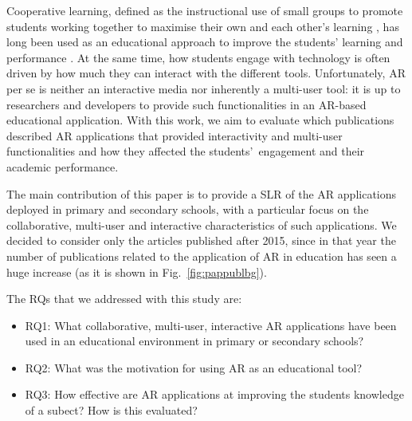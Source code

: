 Cooperative learning, defined as the instructional use of small groups to promote students working together to maximise their own and each other's learning \citep{johnson1991cooperation}, has long been used as an educational approach to improve the students' learning and performance \citep{johnson2008active, kuh2011piecing}. At the same time, how students engage with technology is often driven by how much they can interact with the different tools. Unfortunately, AR per se is neither an interactive media nor inherently a multi-user tool: it is up to researchers and developers to provide such functionalities in an AR-based educational application. With this work, we aim to evaluate which publications described AR applications that provided interactivity and multi-user functionalities and how they affected the students'\ engagement and their academic performance.

The main contribution of this paper is to provide a \gls{SLR} of the \gls{AR} applications deployed in primary and secondary schools, with a particular focus on the collaborative, multi-user and interactive characteristics of such applications. We decided to consider only the articles published after 2015, since in that year the number of publications related to the application of \gls{AR} in education has seen a huge increase (as it is shown in Fig.~\ref{fig:pappublbg}).

The \glspl{RQ} that we addressed with this study are:
\begin{itemize}
    \item \gls{RQ}1: What collaborative, multi-user, interactive \gls{AR} applications have been used in an educational environment in primary or secondary schools?
    \item \gls{RQ}2: What was the motivation for using \gls{AR} as an educational tool?
    \item \gls{RQ}3: How effective are \gls{AR} applications at improving the students knowledge of a subect? How is this evaluated?
\end{itemize}

